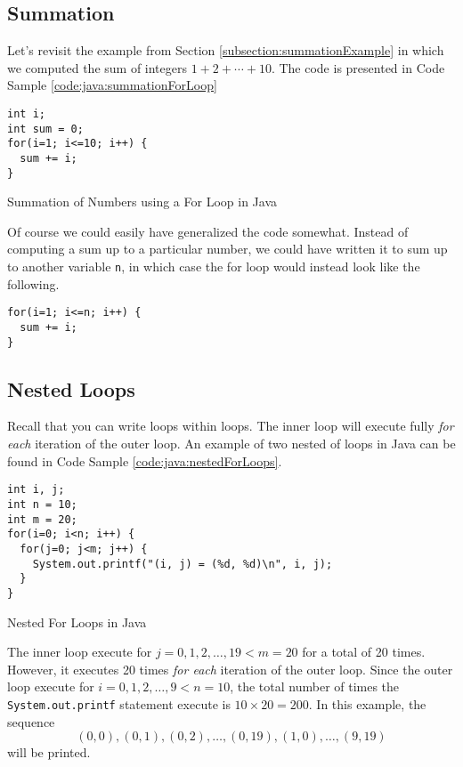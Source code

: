 \subsection{Summation}

Let's revisit the example from Section \ref{subsection:summationExample} in which
we computed the sum of integers $1 + 2 + \cdots + 10$.  The code is presented in
Code Sample \ref{code:java:summationForLoop}

\begin{listing}[H]
\begin{verbatim}
int i;
int sum = 0;
for(i=1; i<=10; i++) {
  sum += i;
}
\end{verbatim}
  \caption{Summation of Numbers using a For Loop in Java}
  \label{code:java:summationForLoop}
\end{listing}

Of course we could easily have generalized the code somewhat.  Instead of computing
a sum up to a particular number, we could have written it to sum up to another
variable \texttt{n}, in which case the for loop would instead look like the
following.

\begin{verbatim}
for(i=1; i<=n; i++) {
  sum += i;
}
\end{verbatim}

\subsection{Nested Loops}

Recall that you can write loops within loops.  The inner loop will execute fully 
\emph{for each} iteration of the outer loop.  An example of two nested of
loops in Java can be found in Code Sample \ref{code:java:nestedForLoops}.

\begin{listing}[H]
\begin{verbatim}
int i, j;
int n = 10;
int m = 20;
for(i=0; i<n; i++) {
  for(j=0; j<m; j++) {
    System.out.printf("(i, j) = (%d, %d)\n", i, j);
  }
}
\end{verbatim}
  \caption{Nested For Loops in Java}
  \label{code:java:nestedForLoops}
\end{listing}

The inner loop execute for $j = 0, 1, 2, \ldots, 19 < m = 20$ for a total
of 20 times.  However, it executes 20 times \emph{for each} iteration of
the outer loop.  Since the outer loop execute for $i = 0, 1, 2, \ldots, 9 < n = 10$, 
the total number of times the \texttt{System.out.printf} statement execute is
$10 \times 20 = 200$.  In this example, the sequence 
 $$(0, 0), (0, 1), (0, 2), \ldots, (0,19), (1, 0), \ldots, (9, 19)$$
will be printed.

